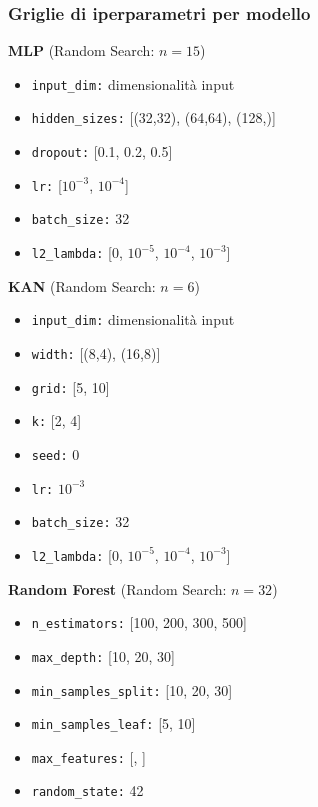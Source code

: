 \documentclass[a4paper,12pt]{report}
\begin{document}
	\subsubsection{Griglie di iperparametri per modello}
	\smallskip
	\noindent\textbf{MLP} \quad (Random Search: $n=15$)
	\begin{itemize}
		\item \texttt{input\_dim:} dimensionalità input
		\item \texttt{hidden\_sizes:} [(32,32), (64,64), (128,)]
		\item \texttt{dropout:} [0.1, 0.2, 0.5]
		\item \texttt{lr:} [$10^{-3}$, $10^{-4}$]
		\item \texttt{batch\_size:} 32
		\item \texttt{l2\_lambda:} [0, $10^{-5}$, $10^{-4}$, $10^{-3}$]
	\end{itemize}
	
	\smallskip
	\noindent\textbf{KAN} \quad (Random Search: $n=6$)
	\begin{itemize}
		\item \texttt{input\_dim:} dimensionalità input
		\item \texttt{width:} [(8,4), (16,8)]
		\item \texttt{grid:} [5, 10]
		\item \texttt{k:} [2, 4]
		\item \texttt{seed:} 0
		\item \texttt{lr:} $10^{-3}$
		\item \texttt{batch\_size:} 32
		\item \texttt{l2\_lambda:} [0, $10^{-5}$, $10^{-4}$, $10^{-3}$]
	\end{itemize}
	
	\smallskip
	\noindent\textbf{Random Forest} \quad (Random Search: $n=32$)
	\begin{itemize}
		\item \texttt{n\_estimators:} [100, 200, 300, 500]
		\item \texttt{max\_depth:} [10, 20, 30]
		\item \texttt{min\_samples\_split:} [10, 20, 30]
		\item \texttt{min\_samples\_leaf:} [5, 10]
		\item \texttt{max\_features:} [, ]
		\item \texttt{random\_state:} 42
	\end{itemize}
	
\end{document}
